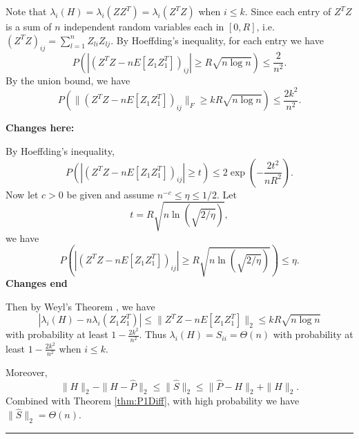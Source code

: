 \documentclass[a4paper]{article}
\newenvironment{proof}{{\bf Proof:  }}{\hfill\rule{2mm}{2mm}}
\begin{document}
\noindent
\begin{proof}
Note that $\lambda_i(H) = \lambda_i(Z Z^T) = \lambda_i(Z^T Z)$ when $i \le k$. Since each entry of $Z^T Z$ is a sum of $n$ independent random variables each in $[0, R]$, i.e. $(Z^T Z)_{ij} = \sum_{l = 1}^n Z_{li} Z_{lj}$. By Hoeffding's inequality, for each entry we have
\[
P(|(Z^T Z - n E[Z_1 Z_1^T])_{ij}| \ge R \sqrt{n\log{n}}) \le \frac{2}{n^2}.
\]
By the union bound, we have
\[
P(\|(Z^T Z - n E[Z_1 Z_1^T])_{ij}\|_F \ge k R \sqrt{n\log{n}}) \le \frac{2 k^2}{n^2}.
\]

\noindent \textbf{Changes here:}

By Hoeffding's inequality,
\[
P(|(Z^T Z - n E[Z_1 Z_1^T])_{ij}| \ge t) \le 2 \exp(-\frac{2t^2}{n R^2}).
\]
Now let $c > 0$ be given and assume $n^{-c} \le \eta \le 1/2$. Let
\[
	t =  R \sqrt{n \ln(\sqrt{2/\eta})},
\]
we have
\[
P(|(Z^T Z - n E[Z_1 Z_1^T])_{ij}| \ge R \sqrt{n \ln(\sqrt{2/\eta})}) \le \eta.
\]
\noindent \textbf{Changes end}

Then by Weyl's Theorem \cite{horn2012matrix}, we have
\[
|\lambda_i(H) - n \lambda_i(Z_1 Z_1^T)| \le \|Z^T Z - n E[Z_1 Z_1^T]\|_2 \le k R \sqrt{n\log{n}}
\]
with probability at least $1 - \frac{2 k^2}{n^2}$.
Thus $\lambda_i(H) = S_{ii} = \Theta(n)$ with probability at least $1 - \frac{2 k^2}{n^2}$ when $i \le k$.

Moreover,
\[
\| H \|_2 - \|H - \hat{P}\|_2 \le \|\hat{S}\|_2 \le \|\hat{P} - H\|_2 + \|H\|_2.
\]
Combined with Theorem \ref{thm:P1Diff}, with high probability we have $\|\hat{S}\|_2 = \Theta(n)$.
\end{proof}
\end{document}
